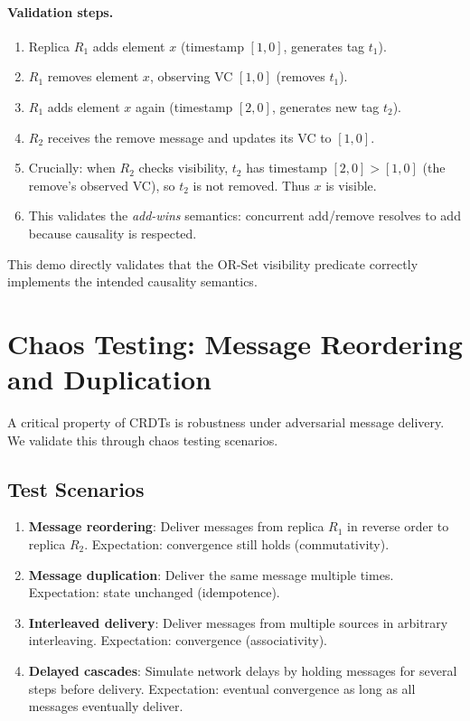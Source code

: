 \paragraph{Validation steps.}
\begin{enumerate}
  \item Replica $R_1$ adds element $x$ (timestamp $[1,0]$, generates tag $t_1$).
  \item $R_1$ removes element $x$, observing VC $[1,0]$ (removes $t_1$).
  \item $R_1$ adds element $x$ again (timestamp $[2,0]$, generates new tag $t_2$).
  \item $R_2$ receives the remove message and updates its VC to $[1,0]$.
  \item Crucially: when $R_2$ checks visibility, $t_2$ has timestamp $[2,0] > [1,0]$ (the remove's observed VC), so $t_2$ is not removed. Thus $x$ is visible.
  \item This validates the \emph{add-wins} semantics: concurrent add/remove resolves to add because causality is respected.
\end{enumerate}

This demo directly validates that the OR-Set visibility predicate correctly implements the intended causality semantics.

\section{Chaos Testing: Message Reordering and Duplication}\label{sec:chaos-testing}

A critical property of CRDTs is robustness under adversarial message delivery. We validate this through chaos testing scenarios.

\subsection{Test Scenarios}

\begin{enumerate}
  \item \textbf{Message reordering}: Deliver messages from replica $R_1$ in reverse order to replica $R_2$. Expectation: convergence still holds (commutativity).
  
  \item \textbf{Message duplication}: Deliver the same message multiple times. Expectation: state unchanged (idempotence).
  
  \item \textbf{Interleaved delivery}: Deliver messages from multiple sources in arbitrary interleaving. Expectation: convergence (associativity).
  
  \item \textbf{Delayed cascades}: Simulate network delays by holding messages for several steps before delivery. Expectation: eventual convergence as long as all messages eventually deliver.
\end{enumerate}

